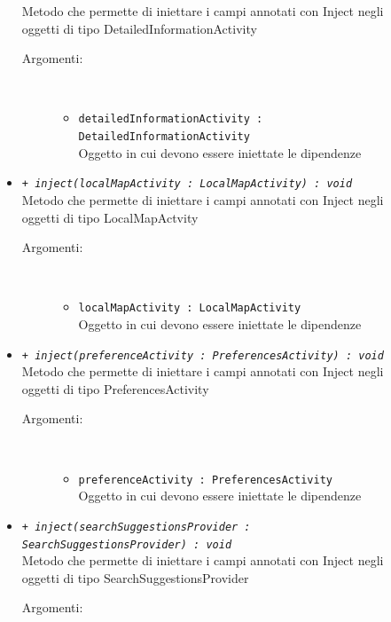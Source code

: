 \documentclass[../DefinizioneDiProdotto.tex]{subfiles}
\begin{document}
\begin{description}
\begin{itemize}
		Metodo che permette di iniettare i campi annotati con Inject negli oggetti di tipo DetailedInformationActivity
		\begin{description}
			\item[Argomenti:] \
			\begin{itemize}
				\item \texttt{detailedInformationActivity : DetailedInformationActivity}\\
				Oggetto in cui devono essere iniettate le dipendenze\end{itemize}
		\end{description}
		\item \texttt{+ \textit{inject(localMapActivity : LocalMapActivity) : void}}\\
		Metodo che permette di iniettare i campi annotati con Inject negli oggetti di tipo LocalMapActvity
		\begin{description}
			\item[Argomenti:] \
			\begin{itemize}
				\item \texttt{localMapActivity : LocalMapActivity}\\
				Oggetto in cui devono essere iniettate le dipendenze\end{itemize}
		\end{description}
		\item \texttt{+ \textit{inject(preferenceActivity : PreferencesActivity) : void}}\\
		Metodo che permette di iniettare i campi annotati con Inject negli oggetti di tipo PreferencesActivity
		\begin{description}
			\item[Argomenti:] \
			\begin{itemize}
				\item \texttt{preferenceActivity : PreferencesActivity}\\
				Oggetto in cui devono essere iniettate le dipendenze\end{itemize}
		\end{description}
		\item \texttt{+ \textit{inject(searchSuggestionsProvider : SearchSuggestionsProvider) : void}}\\
		Metodo che permette di iniettare i campi annotati con Inject negli oggetti di tipo SearchSuggestionsProvider
		\begin{description}
			\item[Argomenti:] \
			\begin{itemize}

\end{itemize}
\end{description}
\end{itemize}
\end{description}
\end{document}
